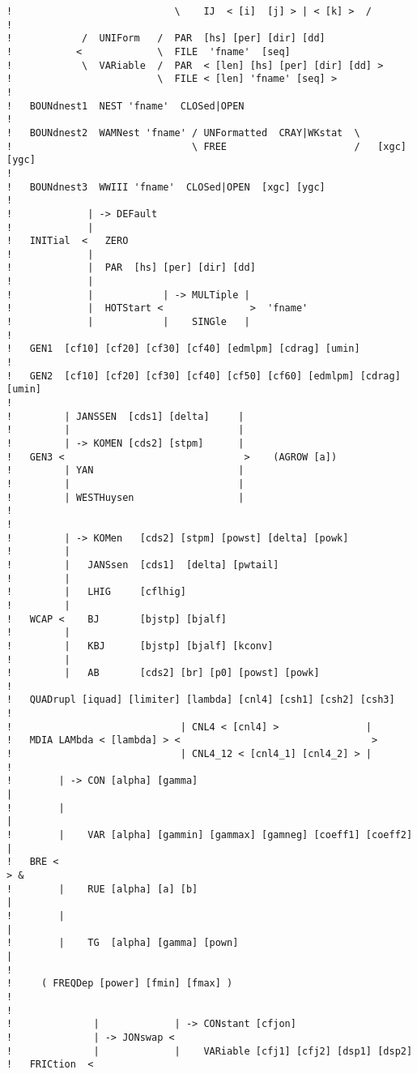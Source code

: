 \documentclass[12pt]{book}
\begin{document}
\begin{verbatim}
!                            \    IJ  < [i]  [j] > | < [k] >  /
!
!            /  UNIForm   /  PAR  [hs] [per] [dir] [dd]
!           <             \  FILE  'fname'  [seq]
!            \  VARiable  /  PAR  < [len] [hs] [per] [dir] [dd] >
!                         \  FILE < [len] 'fname' [seq] >
!
!   BOUNdnest1  NEST 'fname'  CLOSed|OPEN
!
!   BOUNdnest2  WAMNest 'fname' / UNFormatted  CRAY|WKstat  \
!                               \ FREE                      /   [xgc] [ygc]
!
!   BOUNdnest3  WWIII 'fname'  CLOSed|OPEN  [xgc] [ygc]
!
!             | -> DEFault
!             |
!   INITial  <   ZERO
!             |
!             |  PAR  [hs] [per] [dir] [dd]
!             |
!             |            | -> MULTiple |
!             |  HOTStart <               >  'fname'
!             |            |    SINGle   |
!
!   GEN1  [cf10] [cf20] [cf30] [cf40] [edmlpm] [cdrag] [umin]
!
!   GEN2  [cf10] [cf20] [cf30] [cf40] [cf50] [cf60] [edmlpm] [cdrag] [umin]
!
!         | JANSSEN  [cds1] [delta]     |
!         |                             |
!         | -> KOMEN [cds2] [stpm]      |
!   GEN3 <                               >    (AGROW [a])
!         | YAN                         |
!         |                             |
!         | WESTHuysen                  |
!
!
!         | -> KOMen   [cds2] [stpm] [powst] [delta] [powk]
!         |
!         |   JANSsen  [cds1]  [delta] [pwtail]
!         |
!         |   LHIG     [cflhig]
!         |
!   WCAP <    BJ       [bjstp] [bjalf]
!         |
!         |   KBJ      [bjstp] [bjalf] [kconv]
!         |
!         |   AB       [cds2] [br] [p0] [powst] [powk]
!
!   QUADrupl [iquad] [limiter] [lambda] [cnl4] [csh1] [csh2] [csh3]
!
!                             | CNL4 < [cnl4] >               |
!   MDIA LAMbda < [lambda] > <                                 >
!                             | CNL4_12 < [cnl4_1] [cnl4_2] > |
!
!        | -> CON [alpha] [gamma]                                      |
!        |                                                             |
!        |    VAR [alpha] [gammin] [gammax] [gamneg] [coeff1] [coeff2] |
!   BRE <                                                               > &
!        |    RUE [alpha] [a] [b]                                      |
!        |                                                             |
!        |    TG  [alpha] [gamma] [pown]                               |
!
!     ( FREQDep [power] [fmin] [fmax] )
!
!
!              |             | -> CONstant [cfjon]
!              | -> JONswap <
!              |             |    VARiable [cfj1] [cfj2] [dsp1] [dsp2]
!   FRICtion  <

\end{verbatim}
\end{document}
